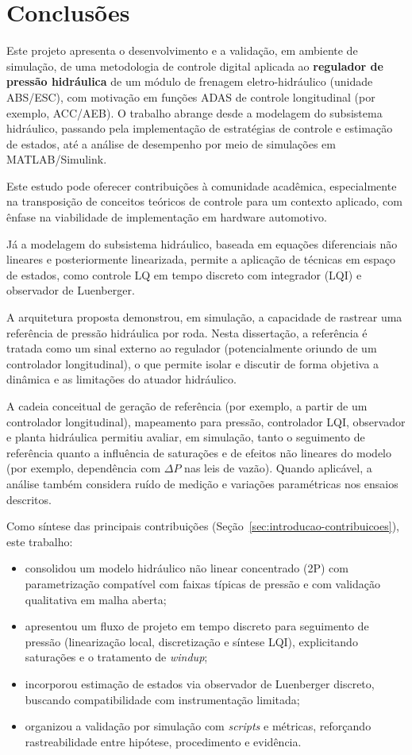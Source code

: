 \chapter{Conclusões}
\label{chap:conclusoes}

Este projeto apresenta o desenvolvimento e a validação, em ambiente de simulação, de uma metodologia de controle digital aplicada ao \textbf{regulador de pressão hidráulica} de um módulo de frenagem eletro-hidráulico (unidade ABS/ESC), com motivação em funções ADAS de controle longitudinal (por exemplo, ACC/AEB). O trabalho abrange desde a modelagem do subsistema hidráulico, passando pela implementação de estratégias de controle e estimação de estados, até a análise de desempenho por meio de simulações em MATLAB/Simulink.

Este estudo pode oferecer contribuições à comunidade acadêmica, especialmente na transposição de conceitos teóricos de controle para um contexto aplicado, com ênfase na viabilidade de implementação em hardware automotivo. 

Já a modelagem do subsistema hidráulico, baseada em equações diferenciais não lineares e posteriormente linearizada, permite a aplicação de técnicas em espaço de estados, como controle LQ em tempo discreto com integrador (LQI) e observador de Luenberger.

A arquitetura proposta demonstrou, em simulação, a capacidade de rastrear uma referência de pressão hidráulica por roda. Nesta dissertação, a referência é tratada como um sinal externo ao regulador (potencialmente oriundo de um controlador longitudinal), o que permite isolar e discutir de forma objetiva a dinâmica e as limitações do atuador hidráulico.

A cadeia conceitual de geração de referência (por exemplo, a partir de um controlador longitudinal), mapeamento para pressão, controlador LQI, observador e planta hidráulica permitiu avaliar, em simulação, tanto o seguimento de referência quanto a influência de saturações e de efeitos não lineares do modelo (por exemplo, dependência com $\Delta P$ nas leis de vazão). Quando aplicável, a análise também considera ruído de medição e variações paramétricas nos ensaios descritos.

Como síntese das principais contribuições (Seção~\ref{sec:introducao-contribuicoes}), este trabalho:
\begin{itemize}
	\item consolidou um modelo hidráulico não linear concentrado (2P) com parametrização compatível com faixas típicas de pressão e com validação qualitativa em malha aberta;
	\item apresentou um fluxo de projeto em tempo discreto para seguimento de pressão (linearização local, discretização e síntese LQI), explicitando saturações e o tratamento de \textit{windup};
	\item incorporou estimação de estados via observador de Luenberger discreto, buscando compatibilidade com instrumentação limitada;
	\item organizou a validação por simulação com \textit{scripts} e métricas, reforçando rastreabilidade entre hipótese, procedimento e evidência.
\end{itemize}

